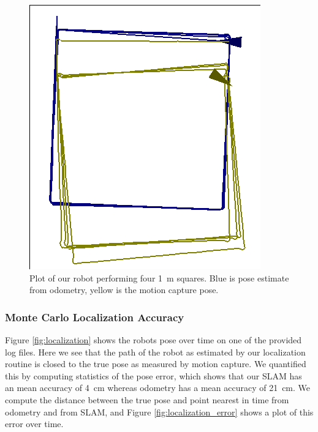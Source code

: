 \documentclass[journal]{IEEEtran}
\begin{document}
    \begin{figure}[b]
        \centering
        \includegraphics[width=1\linewidth]{odometry4.png}
        \caption{Plot of our robot performing four \SI{1}{\meter} squares. Blue is pose estimate from odometry, yellow is the motion capture pose.}
        \label{fig:odometry_squares}
    \end{figure}
    
        \subsubsection{Monte Carlo Localization Accuracy}
        
            Figure \ref{fig:localization} shows the robots pose over time on one of the provided log files. Here we see that the path of the robot as estimated by our localization routine is closed to the true pose as measured by motion capture. We quantified this by computing statistics of the pose error, which shows that our SLAM has an mean accuracy of \SI{4}{\centi\meter} whereas odometry has a mean accuracy of \SI{21}{\centi\meter}. We compute the distance between the true pose and point nearest in time from odometry and from SLAM, and Figure \ref{fig:localization_error} shows a plot of this error over time.
            
\end{document}
